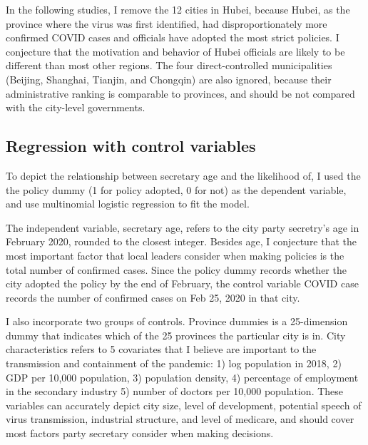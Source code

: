 \documentclass{article}
\begin{document}
\begin{CJK}{UTF8}{gbsn}
In the following studies, I remove the 12 cities in Hubei, because Hubei, as the province where the virus was first identified, had disproportionately more confirmed COVID cases and officials have adopted the most strict policies. I conjecture that the motivation and behavior of Hubei officials are likely to be different than most other regions. The four direct-controlled municipalities (Beijing, Shanghai, Tianjin, and Chongqin) are also ignored, because their administrative ranking is comparable to provinces, and should be not compared with the city-level governments.

\subsection{Regression with control variables}

To depict the relationship between secretary age and the likelihood of, I used the the policy dummy (1 for policy adopted, 0 for not) as the dependent variable, and use multinomial logistic regression to fit the model. 

The independent variable, secretary age, refers to the city party secretry's age in February 2020, rounded to the closest integer. Besides age, I conjecture that the most important factor that local leaders consider when making policies is the total number of confirmed cases. Since the policy dummy records whether the city adopted the policy by the end of February, the control variable COVID case records the number of confirmed cases on Feb 25, 2020 in that city.

I also incorporate two groups of controls. Province dummies is a 25-dimension dummy that indicates which of the 25 provinces the particular city is in. City characteristics refers to 5 covariates that I believe are important to the transmission and containment of the pandemic: 1) log population in 2018, 2) GDP per 10,000 population, 3) population density, 4) percentage of employment in the secondary industry 5) number of doctors per 10,000 population. These variables can accurately depict city size, level of development, potential speech of virus transmission, industrial structure, and level of medicare, and should cover most factors party secretary consider when making decisions.




\end{CJK}
\end{document}
